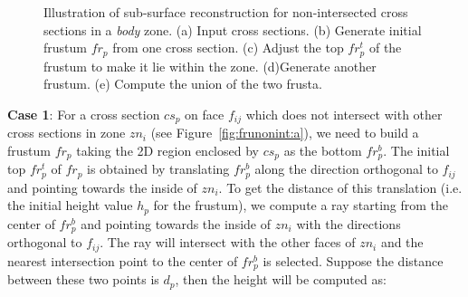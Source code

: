 \begin{figure} [htbp]
{\begin{minipage}[b]{0.3\textwidth}
    \end{minipage}}
  \caption{Illustration of sub-surface reconstruction for non-intersected cross sections in a \textit{body} zone.
  (a) Input cross sections.
  (b) Generate initial frustum $fr_p$ from one cross section.
  (c) Adjust the top $fr_p^t$ of the frustum to make it lie within the zone.
  (d)Generate another frustum.
  (e) Compute the union of the two frusta.}
  \label{fig:frunonint}
\end{figure}

\textbf{Case 1}: For a cross section $cs_p$ on face $f_{ij}$ which
does not intersect with other cross sections in zone $zn_i$ (see
Figure~\ref{fig:frunonint:a}), we need to build a frustum $fr_p$
taking the 2D region enclosed by $cs_p$ as the bottom $fr_p^b$. The
initial top $fr_p^t$ of $fr_p$ is obtained by translating $fr_p^b$
along the direction orthogonal to $f_{ij}$ and pointing towards the
inside of $zn_i$. To get the distance of this translation (i.e. the
initial height value $h_p$ for the frustum), we compute a ray
starting from the center of $fr_p^b$ and pointing towards the inside
of $zn_i$ with the directions orthogonal to $f_{ij}$. The ray will
intersect with the other faces of $zn_i$ and the nearest
intersection point to the center of $fr_p^b$ is selected. Suppose
the distance between these two points is $d_p$, then the height will
be computed as:

